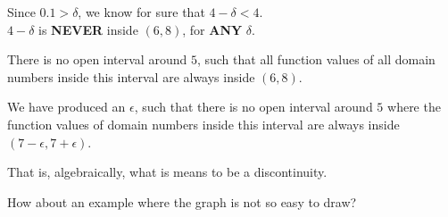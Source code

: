 \documentclass{ximera}
\begin{document}
\begin{example}
\begin{image}
\end{image}



Since $0.1 > \delta$, we know for sure that $4 - \delta < 4$.  \\
$4 - \delta$ is \textbf{\textcolor{red!70!black}{NEVER}} inside $(6, 8)$, for \textbf{\textcolor{red!70!black}{ANY}} $\delta$.



There is no open interval around $5$, such that all function values of all domain numbers inside this interval are always inside $(6,8)$. 




We have produced an $\epsilon$, such that there is no open interval around $5$ where the function values of domain numbers inside this interval are always inside $(7-\epsilon , 7+\epsilon)$.


That is, algebraically, what is means to be a discontinuity.




\end{example}




























How about an example where the graph is not so easy to draw?
\end{document}

